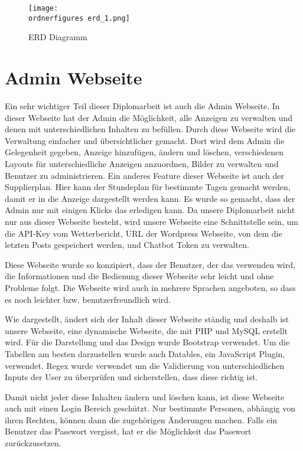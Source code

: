 \begin{figure}[H]
	\centering
	\texttt{[image: \\ordnerfigures erd\_1.png]}
	\caption{ERD Diagramm}
	\label{fi:erd}
\end{figure}

\section{Admin Webseite}
Ein sehr wichtiger Teil dieser Diplomarbeit ist auch die Admin Webseite. In dieser Webseite hat der Admin die M\"{o}glichkeit, alle Anzeigen zu verwalten und denen mit unterschiedlichen Inhalten zu bef\"{u}llen. Durch diese Webseite wird die Verwaltung einfacher und \"{u}bersichtlicher gemacht. Dort wird dem Admin die Gelegenheit gegeben, Anzeige hinzuf\"{u}gen, \"{a}ndern und l\"{o}schen, verschiedenen Layouts f\"{u}r unterschiedliche Anzeigen anzuordnen, Bilder zu verwalten und Benutzer zu administrieren. Ein anderes Feature dieser Webseite ist auch der Supplierplan. Hier kann der Stundeplan f\"{u}r bestimmte Tagen gemacht werden, damit er in die Anzeige dargestellt werden kann. Es wurde so gemacht, dass der Admin nur mit einigen Klicks das erledigen kann. Da unsere Diplomarbeit nicht nur aus dieser Webseite besteht, wird unsere Webseite eine Schnittstelle sein, um die API-Key vom Wetterbericht, URL der Wordpress Webseite, von dem die letzten Posts gespeichert werden, und Chatbot Token zu verwalten.

Diese Webseite wurde so konzipiert, dass der Benutzer, der das verwenden wird, die Informationen und die Bedienung dieser Webseite sehr leicht und ohne Probleme folgt. Die Webseite wird auch in mehrere Sprachen angeboten, so dass es noch leichter bzw. benutzerfreundlich wird.

Wie dargestellt, \"{a}ndert sich der Inhalt dieser Webseite  st\"{a}ndig und deshalb ist unsere Webseite, eine dynamische Webseite, die mit PHP und MySQL erstellt wird. F\"{u}r die Darstellung und das Design wurde Bootstrap verwendet. Um die Tabellen am besten darzustellen wurde auch Datables, ein JavaScript Plugin, verwendet. Regex wurde verwendet um die Validierung von unterschiedlichen Inputs der User zu \"{u}berpr\"{u}fen und sicherstellen, dass diese richtig ist.


Damit nicht jeder diese Inhalten \"{a}ndern und l\"{o}schen kann, ist diese Webseite auch mit einen Login Bereich gesch\"{u}tzt. Nur bestimmte Personen, abh\"{a}ngig von ihren Rechten, k\"{o}nnen dann die zugeh\"{o}rigen \"{A}nderungen machen. Falls ein Benutzer das Passwort vergisst, hat er die M\"{o}glichkeit das Passwort zur\"{u}ckzusetzen.


